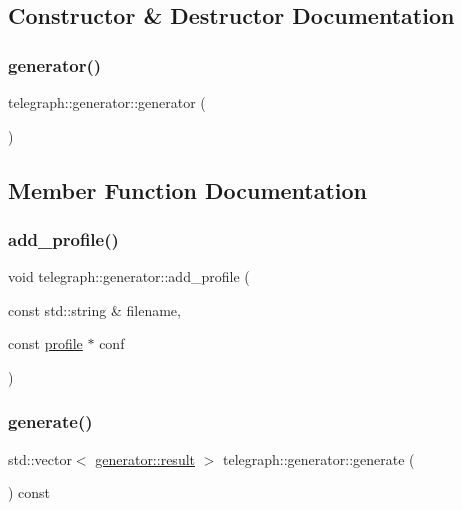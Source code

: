 \subsection{Constructor \& Destructor Documentation}
\mbox{\label{classtelegraph_1_1generator_add831bd47c4792a2b4a2726fc13bada4}} 
\subsubsection{\texorpdfstring{generator()}{generator()}}
{\footnotesize\ttfamily telegraph\+::generator\+::generator (\begin{DoxyParamCaption}{ }\end{DoxyParamCaption})}



\subsection{Member Function Documentation}
\mbox{\label{classtelegraph_1_1generator_a7cb9bbac059ab2fca31937d2982506a8}} 
\subsubsection{\texorpdfstring{add\+\_\+profile()}{add\_profile()}}
{\footnotesize\ttfamily void telegraph\+::generator\+::add\+\_\+profile (\begin{DoxyParamCaption}\item[{const std\+::string \&}]{filename,  }\item[{const \hyperlink{classtelegraph_1_1profile}{profile} $\ast$}]{conf }\end{DoxyParamCaption})}

\mbox{\label{classtelegraph_1_1generator_a5964a5dba70c651c616e9d5fbbcf6ca2}} 
\subsubsection{\texorpdfstring{generate()}{generate()}}
{\footnotesize\ttfamily std\+::vector$<$ \hyperlink{structtelegraph_1_1generator_1_1result}{generator\+::result} $>$ telegraph\+::generator\+::generate (\begin{DoxyParamCaption}{ }\end{DoxyParamCaption}) const}

